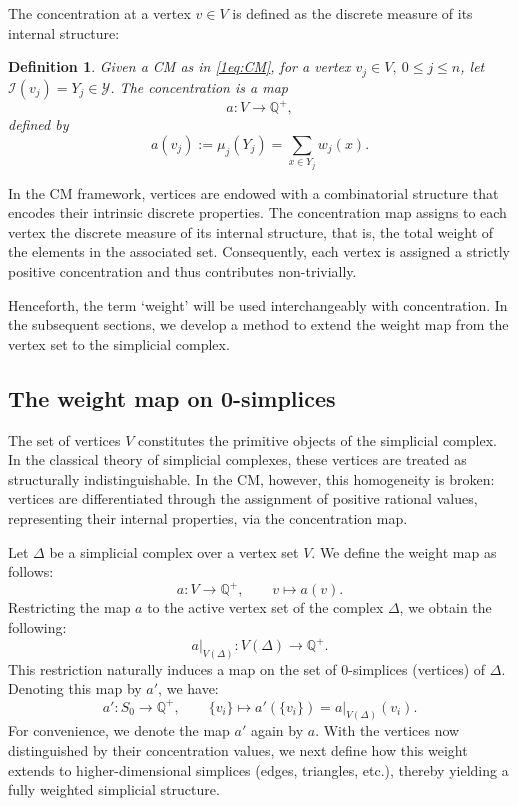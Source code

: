 \documentclass[12pt]{article}
\theoremstyle{normalhead_nobrackets}
\newtheorem{definition}{Definition}[section]
\theoremstyle{exampstyle}
\begin{document}
The {concentration} at a vertex $v \in V$ is defined as the discrete measure of its internal structure:

\begin{definition}
Given a CM as in \eqref{1eq:CM}, for a vertex $v_j \in V, \ 0 \leq j \leq n$, let $\mathcal{I}(v_j) = Y_j \in \mathcal{Y}$.
The concentration is a map
\[
a : V \to \mathbb{Q}^{+},
\]
defined by
\begin{equation*}
    a(v_j) := \mu_j(Y_j) = \sum_{x \in Y_j} w_j(x).
\end{equation*}
\end{definition}

In the CM framework, vertices are endowed with a combinatorial structure that encodes their intrinsic discrete properties. The concentration map assigns to each vertex the discrete measure of its internal structure, that is, the total weight of the elements in the associated set. Consequently, each vertex is assigned a strictly positive concentration and thus contributes non-trivially.

Henceforth, the term `weight' will be used interchangeably with concentration. In the subsequent sections, we develop a method to extend the weight map from the vertex set to the simplicial complex.

\subsection{The weight map on 0-simplices}

The set of vertices $V$ constitutes the primitive objects of the simplicial complex. In the classical theory of simplicial complexes, these vertices are treated as structurally indistinguishable. In the CM, however, this homogeneity is broken: vertices are differentiated through the assignment of positive rational values, representing their internal properties, via the concentration map. 

Let $\Delta$ be a simplicial complex over a vertex set $V$. We define the weight map as follows:
\[
a : V \to \mathbb{Q}^+, \qquad v \mapsto a(v).
\]
Restricting the map $a$ to the active vertex set of the complex $\Delta$, we obtain the following:
\[
a|_{V(\Delta)} : V(\Delta) \to \mathbb{Q}^+.
\]
This restriction naturally induces a map on the set of $0$-simplices (vertices) of $\Delta$. Denoting this map by $a'$, we have:
\[
a' : S_0 \to \mathbb{Q}^+, \qquad 
\{v_i\} \mapsto a'(\{v_i\}) = a|_{V(\Delta)}(v_i).
\]
For convenience, we denote the map $a'$ again by $a$.
With the vertices now distinguished by their concentration values, we next define how this weight extends to higher-dimensional simplices (edges, triangles, etc.), thereby yielding a fully weighted simplicial structure.
\end{document}
